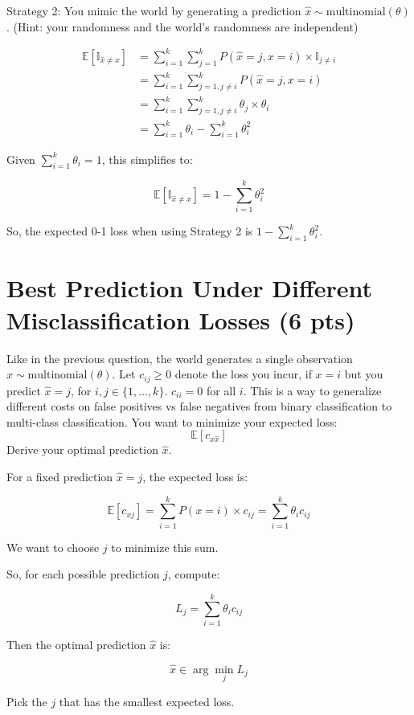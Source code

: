 \documentclass[a4paper]{article}
\theoremstyle{definition}
\def\E{\mathbb E}
\newenvironment{soln}{
    \leavevmode\color{blue}\ignorespaces
}{}
\begin{document}
Strategy 2: You mimic the world by generating a prediction $\hat x \sim \mbox{multinomial}(\theta)$.  (Hint: your randomness and the world's randomness are independent)

\begin{soln}
    
    \begin{align*}
    \E[\mathbb{I}_{\hat{x} \neq x}] &= \sum_{i=1}^{k} \sum_{j=1}^{k} P(\hat{x} = j, x = i) \times \mathbb{I}_{j \neq i} \\
    &= \sum_{i=1}^{k} \sum_{j=1, j \neq i}^{k} P(\hat{x} = j, x = i) \\
    &= \sum_{i=1}^{k} \sum_{j=1, j \neq i}^{k} \theta_j \times \theta_i \\
    &= \sum_{i=1}^{k} \theta_i - \sum_{i=1}^{k} \theta_i^2
    \end{align*}

    Given $\sum_{i=1}^{k} \theta_i = 1$, this simplifies to:

    \[
    \E[\mathbb{I}_{\hat{x} \neq x}] = 1 - \sum_{i=1}^{k} \theta_i^2
    \]

    So, the expected 0-1 loss when using Strategy 2 is \( 1 - \sum_{i=1}^{k} \theta_i^2 \).
\end{soln}

\section{Best Prediction Under Different Misclassification Losses (6 pts)}
Like in the previous question, 
the world generates a single observation $x \sim \mbox{multinomial}(\theta)$.
Let $c_{ij} \ge 0$ denote the loss you incur, if $x=i$ but you predict $\hat x=j$, for $i,j \in \{1, \ldots, k\}$.
$c_{ii}=0$ for all $i$.
This is a way to generalize different costs on false positives vs false negatives from binary classification to multi-class classification.
You want to minimize your expected loss:
$$\E[c_{x \hat x}]$$
Derive your optimal prediction $\hat x$.

\begin{soln}

    For a fixed prediction \( \hat{x} = j \), the expected loss is:

    \[ \E[c_{xj}] = \sum_{i=1}^{k} P(x=i) \times c_{ij} = \sum_{i=1}^{k} \theta_i c_{ij} \]

    We want to choose \( j \) to minimize this sum. 

    So, for each possible prediction \( j \), compute:

    \[ L_j = \sum_{i=1}^{k} \theta_i c_{ij} \]

    Then the optimal prediction \( \hat{x} \) is:

    \[ \hat{x} \in \arg\min_j L_j \]

    Pick the \( j \) that has the smallest expected loss. 
\end{soln}
\end{document}
